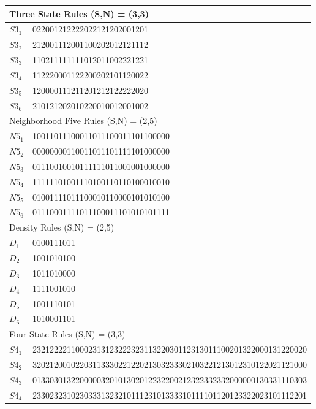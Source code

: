 \documentclass{facconf}
\begin{document}
\begin{multicols}{2}
\begin{table}[!htb] \centering
\small
\begin{tabular}{|p{2cm}|l|}
\hline
\multicolumn{2}{|l|}{Three State Rules (S,N) = (3,3)} \\ \hline
$S3_{1}$ &  022001212222022121202001201 \\ \hline
$S3_{2}$ &  212001112001100202012121112 \\ \hline
$S3_{3}$ &  110211111111012011002221221 \\ \hline
$S3_{4}$ &  112220001122200202101120022 \\ \hline
$S3_{5}$ &  120000111211201212122222020 \\ \hline
$S3_{6}$ &  210121202010220010012001002 \\ \hline
\multicolumn{2}{|l|}{Neighborhood Five Rules (S,N) = (2,5)} \\ \hline
$N5_{1}$ &  10011011100011011100011101100000 \\ \hline
$N5_{2}$ &  00000000110011011101111101000000 \\ \hline
$N5_{3}$ &  01110010010111111011001001000000 \\ \hline
$N5_{4}$ &  11111101001110100110110100010010 \\ \hline
$N5_{5}$ &  01001111011100010110000101010100 \\ \hline
$N5_{6}$ &  01110001111011100011101010101111 \\ \hline
\multicolumn{2}{|l|}{Density Rules (S,N) = (2,5)} \\ \hline
$D_{1}$ &  0100111011\\ \hline
$D_{2}$ &  1001010100\\ \hline
$D_{3}$ &  1011010000\\ \hline
$D_{4}$ &  1111001010\\ \hline
$D_{5}$ &  1001110101\\ \hline
$D_{6}$ &  1010001101\\ \hline
\multicolumn{2}{|l|}{Four State Rules (S,N) = (3,3)} \\ \hline
$S4_{1}$ &  2321222211000231312322232311322030112313011100201322000131220020\\ 
\hline
$S4_{2}$ &  3202120010220311333022122021303233302103221213012310122021121000\\ 
\hline
$S4_{3}$ &  0133030132200000320101302012232200212322332332000000130331110303\\ 
\hline
$S4_{4}$ &  2330232310230333132321011123101333310111101120123322023101112201\\ 

\end{tabular}
\end{table}
\end{multicols}
\end{document}
